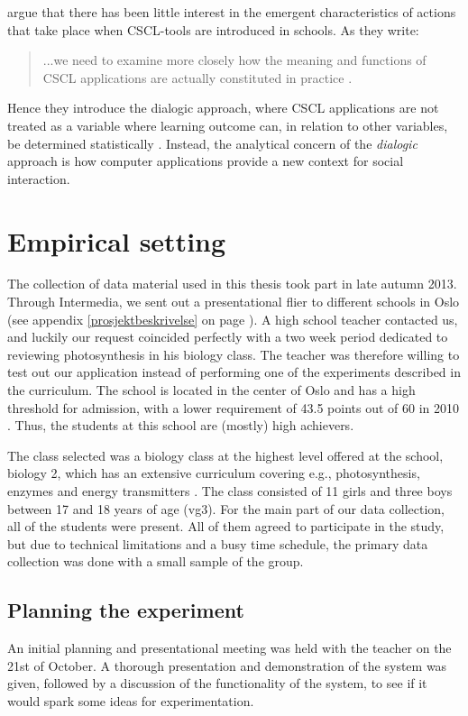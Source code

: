 \citeauthor*{arnseth2006approaching} argue that there has been little interest in the emergent characteristics of actions that take place when CSCL-tools are introduced in schools. As they write: \begin{quote}...we need to examine more closely how the meaning and functions of CSCL applications are actually constituted in practice \citep[p. 181]{arnseth2006approaching}.\end{quote} Hence they introduce the dialogic approach, where CSCL applications are not treated as a variable where learning outcome can, in relation to other variables, be determined statistically . Instead, the analytical concern  of the \emph{dialogic} approach is how computer applications provide a new context for social interaction.

\section{Empirical setting}
The collection of data material used in this thesis took part in late autumn 2013. Through Intermedia, we sent out a presentational flier to different schools in Oslo (see appendix \ref{prosjektbeskrivelse} on page \pageref{prosjektbeskrivelse}). A high school teacher contacted us, and luckily our request coincided perfectly with a two week period dedicated to reviewing photosynthesis in his biology class. The teacher was therefore willing to test out our application instead of performing one of the experiments described in the curriculum. The school is located in the center of Oslo and has a high threshold for admission, with a lower requirement of 43.5 points out of 60 in 2010 \citep{utdanningsetaten}. Thus, the students at this school are (mostly) high achievers.  

The class selected was a biology class at the highest level offered at the school, biology 2, which has an extensive curriculum covering e.g., photosynthesis, enzymes and energy transmitters \citep{bios}. The class consisted of 11 girls and three boys between 17 and 18 years of age (vg3). For the main part of our data collection, all of the students were present. All of them agreed to participate in the study, but due to technical limitations and a busy time schedule, the primary data collection was  done with a small sample of the group. 


\subsection{Planning the experiment}
An initial planning and presentational meeting was held with the teacher on the 21st of October. A thorough presentation and demonstration of the system was given, followed by a discussion of the functionality of the system, to see if it would spark some ideas for experimentation. 

